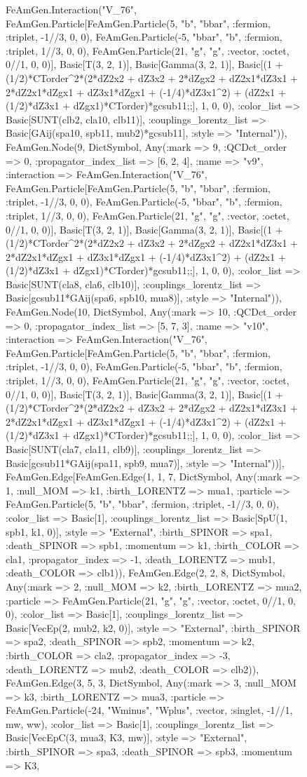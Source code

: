 \documentclass{revtex4}
\begin{document}
\begin{figure}[!htb]
\begin{center}
{FeAmGen.Interaction("V_76", FeAmGen.Particle[FeAmGen.Particle(5, "b", "bbar", :fermion, :triplet, -1//3, 0, 0), FeAmGen.Particle(-5, "bbar", "b", :fermion, :triplet, 1//3, 0, 0), FeAmGen.Particle(21, "g", "g", :vector, :octet, 0//1, 0, 0)], Basic[T(3, 2, 1)], Basic[Gamma(3, 2, 1)], Basic[(1 + (1/2)*CTorder^2*(2*dZ2x2 + dZ3x2 + 2*dZgx2 + dZ2x1*dZ3x1 + 2*dZ2x1*dZgx1 + dZ3x1*dZgx1 + (-1/4)*dZ3x1^2) + (dZ2x1 + (1/2)*dZ3x1 + dZgx1)*CTorder)*gcsub11;;], 1, 0, 0), :color_list => Basic[SUNT(clb2, cla10, clb11)], :couplings_lorentz_list => Basic[GAij(spa10, spb11, mub2)*gcsub11], :style => "Internal")), FeAmGen.Node(9, Dict{Symbol, Any}(:mark => 9, :QCDct_order => 0, :propagator_index_list => [6, 2, 4], :name => "v9", :interaction => FeAmGen.Interaction("V_76", FeAmGen.Particle[FeAmGen.Particle(5, "b", "bbar", :fermion, :triplet, -1//3, 0, 0), FeAmGen.Particle(-5, "bbar", "b", :fermion, :triplet, 1//3, 0, 0), FeAmGen.Particle(21, "g", "g", :vector, :octet, 0//1, 0, 0)], Basic[T(3, 2, 1)], Basic[Gamma(3, 2, 1)], Basic[(1 + (1/2)*CTorder^2*(2*dZ2x2 + dZ3x2 + 2*dZgx2 + dZ2x1*dZ3x1 + 2*dZ2x1*dZgx1 + dZ3x1*dZgx1 + (-1/4)*dZ3x1^2) + (dZ2x1 + (1/2)*dZ3x1 + dZgx1)*CTorder)*gcsub11;;], 1, 0, 0), :color_list => Basic[SUNT(cla8, cla6, clb10)], :couplings_lorentz_list => Basic[gcsub11*GAij(spa6, spb10, mua8)], :style => "Internal")), FeAmGen.Node(10, Dict{Symbol, Any}(:mark => 10, :QCDct_order => 0, :propagator_index_list => [5, 7, 3], :name => "v10", :interaction => FeAmGen.Interaction("V_76", FeAmGen.Particle[FeAmGen.Particle(5, "b", "bbar", :fermion, :triplet, -1//3, 0, 0), FeAmGen.Particle(-5, "bbar", "b", :fermion, :triplet, 1//3, 0, 0), FeAmGen.Particle(21, "g", "g", :vector, :octet, 0//1, 0, 0)], Basic[T(3, 2, 1)], Basic[Gamma(3, 2, 1)], Basic[(1 + (1/2)*CTorder^2*(2*dZ2x2 + dZ3x2 + 2*dZgx2 + dZ2x1*dZ3x1 + 2*dZ2x1*dZgx1 + dZ3x1*dZgx1 + (-1/4)*dZ3x1^2) + (dZ2x1 + (1/2)*dZ3x1 + dZgx1)*CTorder)*gcsub11;;], 1, 0, 0), :color_list => Basic[SUNT(cla7, cla11, clb9)], :couplings_lorentz_list => Basic[gcsub11*GAij(spa11, spb9, mua7)], :style => "Internal"))], FeAmGen.Edge[FeAmGen.Edge(1, 1, 7, Dict{Symbol, Any}(:mark => 1, :null_MOM => k1, :birth_LORENTZ => mua1, :particle => FeAmGen.Particle(5, "b", "bbar", :fermion, :triplet, -1//3, 0, 0), :color_list => Basic[1], :couplings_lorentz_list => Basic[SpU(1, spb1, k1, 0)], :style => "External", :birth_SPINOR => spa1, :death_SPINOR => spb1, :momentum => k1, :birth_COLOR => cla1, :propagator_index => -1, :death_LORENTZ => mub1, :death_COLOR => clb1)), FeAmGen.Edge(2, 2, 8, Dict{Symbol, Any}(:mark => 2, :null_MOM => k2, :birth_LORENTZ => mua2, :particle => FeAmGen.Particle(21, "g", "g", :vector, :octet, 0//1, 0, 0), :color_list => Basic[1], :couplings_lorentz_list => Basic[VecEp(2, mub2, k2, 0)], :style => "External", :birth_SPINOR => spa2, :death_SPINOR => spb2, :momentum => k2, :birth_COLOR => cla2, :propagator_index => -3, :death_LORENTZ => mub2, :death_COLOR => clb2)), FeAmGen.Edge(3, 5, 3, Dict{Symbol, Any}(:mark => 3, :null_MOM => k3, :birth_LORENTZ => mua3, :particle => FeAmGen.Particle(-24, "Wminus", "Wplus", :vector, :singlet, -1//1, mw, ww), :color_list => Basic[1], :couplings_lorentz_list => Basic[VecEpC(3, mua3, K3, mw)], :style => "External", :birth_SPINOR => spa3, :death_SPINOR => spb3, :momentum => K3, }
\end{center}
\end{figure}
\end{document}
